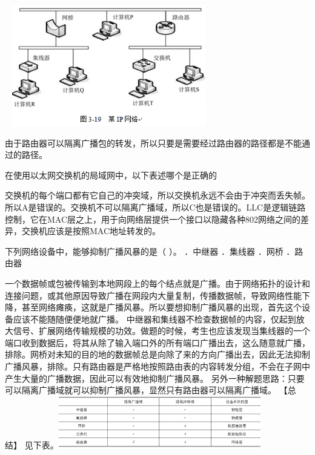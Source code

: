 ~
\includegraphics[width=3.33333in,height=2.08333in]{computerassets/8d1744c03d695e45dcb1f35ee5cc4189.png}
\par{}
\begin{solution}由于路由器可以隔离广播包的转发，所以只要是需要经过路由器的路径都是不能通过的路径。
\end{solution}
\question 在使用以太网交换机的局域网中，以下表述哪个是正确的
\par{}
\begin{solution}交换机的每个端口都有它自己的冲突域，所以交换机永远不会由于冲突而丢失帧。所以A是错误的。交换机不可以隔离广播域，所以C也是错误的。LLC是逻辑链路控制，它在MAC层之上，用于向网络层提供一个接口以隐藏各种802网络之间的差异，交换机应该是按照MAC地址转发的。
\end{solution}
\question 下列网络设备中，能够抑制广播风暴的是（ ）。 ．中继器 ．集线器 ．网桥
．路由器
\par{}
\begin{solution}一个数据帧或包被传输到本地网段上的每个结点就是广播。由于网络拓扑的设计和连接问题，或其他原因导致广播在网段内大量复制，传播数据帧，导致网络性能下降，甚至网络瘫痪，这就是广播风暴。所以要想抑制广播风暴的出现，首先这个设备应该不能随随便便地就广播。
中继器和集线器不检查数据帧的内容，仅起到放大信号、扩展网络传输规模的功效。做题的时候，考生也应该发现当集线器的一个端口收到数据后，将其从除了输入端口外的所有端口广播出去，这么随意就广播，排除。网桥对未知的目的地的数据帧总是向除了来的方向广播出去，因此无法抑制广播风暴，排除。只有路由器是严格地按照路由表的内容转发分组，不会在子网中产生大量的广播数据，因此可以有效地抑制广播风暴。
另外一种解题思路：只要可以隔离广播域就可以抑制广播风暴，显然只有路由器可以隔离广播域。
【总结】
见下表。\includegraphics[width=3.46875in,height=0.89583in]{computerassets/DB7F9A377704A937E9E2FF74A32807E0.png}
\end{solution}
